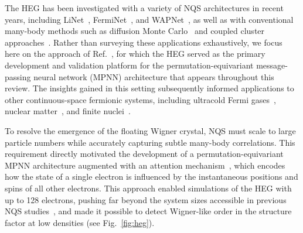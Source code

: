 The HEG has been investigated with a variety of NQS architectures in recent years, including
LiNet~\cite{li_ab_2022}, FermiNet~\cite{cassella_discovering_2023}, and WAPNet~\cite{wilson_neural_2023}, as well as with conventional many-body methods such as diffusion Monte Carlo~\cite{lopez_rios_inhomogeneous_2006,azadi_low-density_2022} and coupled cluster approaches~\cite{liao_towards_2021}.
Rather than surveying these applications exhaustively, we focus here on the approach of Ref.~\cite{pescia_message-passing_2024}, for which the HEG served as the primary development and validation platform for the permutation-equivariant message-passing neural network (MPNN) architecture that appears throughout this review.
The insights gained in this setting subsequently informed applications to other continuous-space fermionic systems, including ultracold Fermi gases~\cite{kim_neural-network_2024}, nuclear matter~\cite{fore_investigating_2024}, and finite nuclei~\cite{gnech_distilling_2024,donna_hypernuclei_2025}.

To resolve the emergence of the floating Wigner crystal, NQS must scale to large particle numbers while accurately capturing subtle many-body correlations.
This requirement directly motivated the development of a permutation-equivariant MPNN architecture augmented with an attention mechanism~\cite{pescia_message-passing_2024}, which encodes how the state of a single electron is influenced by the instantaneous positions and spins of all other electrons.
This approach enabled simulations of the HEG with up to 128 electrons, pushing far beyond the system sizes accessible in previous NQS studies~\cite{li_ab_2022}, and made it possible to detect Wigner-like order in the structure factor at low densities (see Fig.~\ref{fig:heg}).


